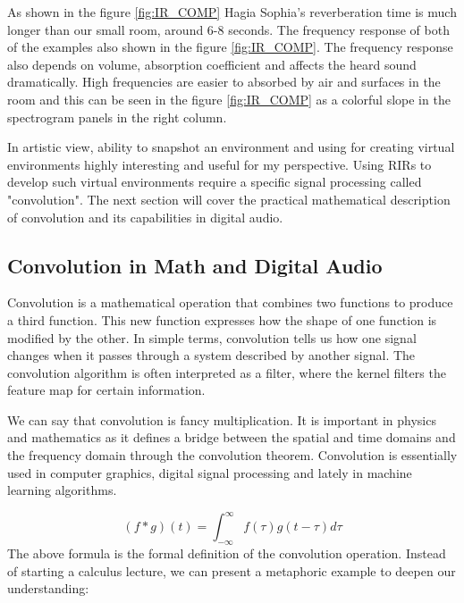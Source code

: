             As shown in the figure \ref{fig:IR_COMP} Hagia Sophia's reverberation time is much longer than our small room, around 6-8 seconds. The frequency response of both of the examples also shown in the figure \ref{fig:IR_COMP}. The frequency response also depends on volume, absorption coefficient and affects the heard sound dramatically. High frequencies are easier to absorbed by air and surfaces\cite{Room_Acoustics} in the room and this can be seen in the figure \ref{fig:IR_COMP} as a colorful slope in the spectrogram panels in the right column.\par

            In artistic view, ability to snapshot an environment and using for creating virtual environments\cite{Recreation_of_the_Acoustics_of_Hagia_Sophia} highly interesting and useful for my perspective. Using RIRs to develop such virtual environments require a specific signal processing called "convolution". The next section will cover the practical mathematical description of convolution and its capabilities in digital audio.            
        \subsection{Convolution in Math and Digital Audio}
            Convolution is a mathematical operation that combines two functions to produce a third function. This new function expresses how the shape of one function is modified by the other. In simple terms, convolution tells us how one signal changes when it passes through a system described by another signal. The convolution algorithm is often interpreted as a filter, where the kernel filters the feature map for certain information\cite{Deep_Learning_Core_Concepts}.\par

            We can say that convolution is fancy multiplication\cite{Guide_to_Convolution}. It is important in physics and mathematics as it defines a bridge between the spatial and time domains and the frequency domain through the convolution theorem. Convolution is essentially used in computer graphics, digital signal processing and lately in machine learning algorithms.\par
            $$(f \ast g)(t)=\int_{-\infty}^{\infty} f(\tau) g(t-\tau) d \tau$$
            The above formula is the formal definition of the convolution operation. Instead of starting a calculus lecture, we can present a metaphoric example to deepen our understanding:\par

